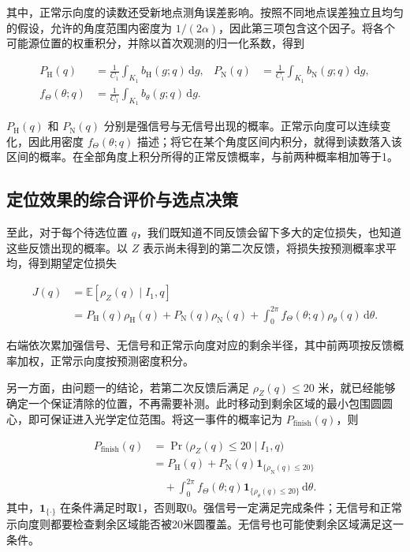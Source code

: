 其中，正常示向度的读数还受新地点测角误差影响。按照不同地点误差独立且均匀的假设，允许的角度范围内密度为 \(1/(2\alpha)\)，因此第三项包含这个因子。将各个可能源位置的权重积分，并除以首次观测的归一化系数，得到

\begin{equation}
\begin{aligned}
 P_{\mathrm H}(q)&=\frac{1}{C_1}\int_{K_1}b_{\mathrm H}(g;q)\,\mathrm dg,
 &P_{\mathrm N}(q)&=\frac{1}{C_1}\int_{K_1}b_{\mathrm N}(g;q)\,\mathrm dg,\\
 f_\Theta(\theta;q)&=\frac{1}{C_1}\int_{K_1}b_\theta(g;q)\,\mathrm dg.
\end{aligned}
\label{eq:q2-pair-prediction}
\end{equation}

\(P_{\mathrm H}(q)\) 和 \(P_{\mathrm N}(q)\) 分别是强信号与无信号出现的概率。正常示向度可以连续变化，因此用密度 \(f_\Theta(\theta;q)\) 描述；将它在某个角度区间内积分，就得到读数落入该区间的概率。在全部角度上积分所得的正常反馈概率，与前两种概率相加等于1。

\subsection{定位效果的综合评价与选点决策}

至此，对于每个待选位置 \(q\)，我们既知道不同反馈会留下多大的定位损失，也知道这些反馈出现的概率。以 \(Z\) 表示尚未得到的第二次反馈，将损失按预测概率求平均，得到期望定位损失

\begin{equation}
\begin{aligned}
 J(q)&=\mathbb E[\rho_Z(q)\mid I_1,q]\\
 &=P_{\mathrm H}(q)\rho_{\mathrm H}(q)+P_{\mathrm N}(q)\rho_{\mathrm N}(q)
 +\int_0^{2\pi}f_\Theta(\theta;q)\rho_\theta(q)\,\mathrm d\theta.
\end{aligned}
\label{eq:q2-pair-expected-objective}
\end{equation}

右端依次累加强信号、无信号和正常示向度对应的剩余半径，其中前两项按反馈概率加权，正常示向度按预测密度积分。

另一方面，由问题一的结论，若第二次反馈后满足 \(\rho_Z(q)\le20\) 米，就已经能够确定一个保证清除的位置，不再需要补测。此时移动到剩余区域的最小包围圆圆心，即可保证进入光学定位范围。将这一事件的概率记为 \(P_{\mathrm{finish}}(q)\)，则

\begin{equation}
\begin{aligned}
 P_{\mathrm{finish}}(q)
 &=\Pr\bigl(\rho_Z(q)\le20\mid I_1,q\bigr)\\
 &=P_{\mathrm H}(q)+P_{\mathrm N}(q)\mathbf1_{\{\rho_{\mathrm N}(q)\le20\}}\\
 &\quad+\int_0^{2\pi}f_\Theta(\theta;q)\mathbf1_{\{\rho_\theta(q)\le20\}}\,\mathrm d\theta.
\end{aligned}
\label{eq:q2-completion-probability}
\end{equation}
其中，\(\mathbf1_{\{\cdot\}}\) 在条件满足时取1，否则取0。强信号一定满足完成条件；无信号和正常示向度则都要检查剩余区域能否被20米圆覆盖。无信号也可能使剩余区域满足这一条件。

